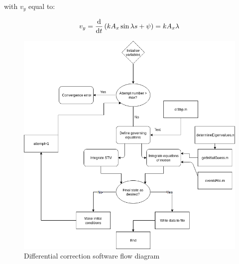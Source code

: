 \noindent with $v_y$ equal to:

\begin{equation}
	v_y = \frac{\textnormal{d}}{\textnormal{d}t} \left(kA_x\sin{\lambda s + \psi}\right) = kA_x\lambda
\end{equation}


\begin{figure}
\centering
\includegraphics[height=.4\textheight]{figures/differentialCorrectorFlow}
\caption{Differential correction software flow diagram}
\label{f:differentialcorrectorflow}
\end{figure}